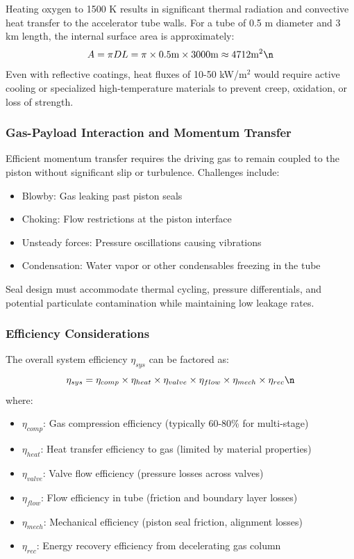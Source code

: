 \documentclass{article}
\begin{document}
Heating oxygen to 1500 K results in significant thermal radiation and convective heat transfer to the accelerator tube walls. For a tube of 0.5 m diameter and 3 km length, the internal surface area is approximately:\n\begin{equation}
 A = \pi D L = \pi \times 0.5  \text{m} \times 3000  \text{m} \approx 4712  \text{m}^2\n\end{equation}
Even with reflective coatings, heat fluxes of 10-50 kW/m$^2$ would require active cooling or specialized high-temperature materials to prevent creep, oxidation, or loss of strength.\n\n\subsubsection{Gas-Payload Interaction and Momentum Transfer}
Efficient momentum transfer requires the driving gas to remain coupled to the piston without significant slip or turbulence. Challenges include:\n\begin{itemize}
    \item Blowby: Gas leaking past piston seals\n    \item Choking: Flow restrictions at the piston interface\n    \item Unsteady forces: Pressure oscillations causing vibrations\n    \item Condensation: Water vapor or other condensables freezing in the tube\n\end{itemize}
Seal design must accommodate thermal cycling, pressure differentials, and potential particulate contamination while maintaining low leakage rates.\n\n\subsubsection{Efficiency Considerations}
The overall system efficiency $\eta_{sys}$ can be factored as:\n\begin{equation}
 \eta_{sys} = \eta_{comp} \times \eta_{heat} \times \eta_{valve} \times \eta_{flow} \times \eta_{mech} \times \eta_{rec}\n\end{equation}
where:\n\begin{itemize}
    \item $\eta_{comp}$: Gas compression efficiency (typically 60-80\% for multi-stage)\n    \item $\eta_{heat}$: Heat transfer efficiency to gas (limited by material properties)\n    \item $\eta_{valve}$: Valve flow efficiency (pressure losses across valves)\n    \item $\eta_{flow}$: Flow efficiency in tube (friction and boundary layer losses)\n    \item $\eta_{mech}$: Mechanical efficiency (piston seal friction, alignment losses)\n    \item $\eta_{rec}$: Energy recovery efficiency from decelerating gas column\n\end{itemize}
\end{document}
